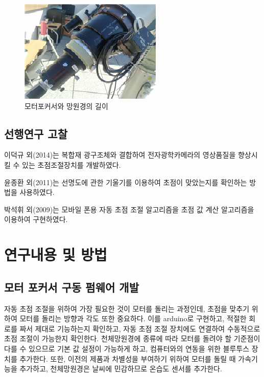 \documentclass{abstract_hutech}
\begin{document}
\begin{figure}[h]
\centering
\includegraphics[width=0.8\linewidth]{telescope3}
\caption{모터포커서와 망원경의 길이}
\label{fig:telescope3}
\end{figure}

\subsection{선행연구 고찰}

이덕규 외(2014)는 복합재 광구조체와 결합하여 전자광학카메라의 영상품질을 향상시킬 수 있는 초점조절장치를 개발하였다.\cite{leedukgu2014}

윤종환 외(2011)는 선명도에 관한 기울기를 이용하여 초점이 맞았는지를 확인하는 방법을 사용하였다.\cite{yunjonghwan2011lcd}

박석휘 외(2009)는 모바일 폰용 자동 초점 조절 알고리즘을 초점 값 계산 알고리즘을 이용하여 구현하였다.\cite{parksukhui2009Median}

\section{연구내용 및 방법}

\subsection{모터 포커서 구동 펌웨어 개발}

자동 초점 조절을 위하여 가장 필요한 것이 모터를 돌리는 과정인데, 초점을 맞추기 위하여 모터를 돌리는 방향과 각도 또한 중요하다. 이를 arduino로 구현하고, 적절한 회로를 짜서 제대로 기능하는지 확인하고, 자동 초점 조절 장치에도 연결하여 수동적으로 초점 조절이 가능한지 확인한다. 천체망원경에 종류에 따라 모터를 돌려야 할 기준점이 다를 수 있으므로 기본 값 설정이 가능하게 하고, 컴퓨터와의 연동을 위한 블루투스 장치를 추가한다. 또한, 이전의 제품과 차별성을 부여하기 위하여 모터를 돌릴 때 가속기능을 추가하고, 천체망원경은 날씨에 민감하므로 온습도 센서를 추가한다.
\end{document}
